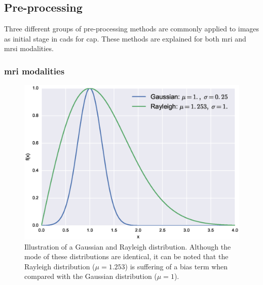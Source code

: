 \subsection{Pre-processing}\label{subsec:chp3img-reg:prepro}
Three different groups of pre-processing methods are commonly applied to images as initial stage in \acp{cad} for \ac{cap}.
These methods are explained for both \ac{mri} and \ac{mrsi} modalities.%


\subsubsection{\acs*{mri} modalities}

\begin{figure}
\centering
	\includegraphics[width=0.7\linewidth]{3_review/figures/processing/pre-processing/noise/noisedistr.eps}
	\caption[Illustration of a Gaussian and Rayleigh distributions.]{Illustration of a Gaussian and Rayleigh distribution. Although the mode of these distributions are identical, it can be noted that the Rayleigh distribution ($\mu=1.253$) is suffering of a bias term when compared with the Gaussian distribution ($\mu=1$).}
	\label{fig:noisedistr}
\end{figure}

